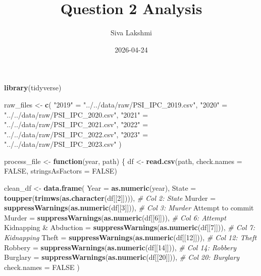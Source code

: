 \documentclass[
]{article}
\title{Question 2 Analysis}
\author{Siva Lakshmi}
\date{2026-04-24}
\newenvironment{Shaded}{\begin{snugshade}}{\end{snugshade}}
\newcommand{\AttributeTok}[1]{\textcolor[rgb]{0.13,0.29,0.53}{#1}}
\newcommand{\CommentTok}[1]{\textcolor[rgb]{0.56,0.35,0.01}{\textit{#1}}}
\newcommand{\ConstantTok}[1]{\textcolor[rgb]{0.56,0.35,0.01}{#1}}
\newcommand{\ControlFlowTok}[1]{\textcolor[rgb]{0.13,0.29,0.53}{\textbf{#1}}}
\newcommand{\DecValTok}[1]{\textcolor[rgb]{0.00,0.00,0.81}{#1}}
\newcommand{\FunctionTok}[1]{\textcolor[rgb]{0.13,0.29,0.53}{\textbf{#1}}}
\newcommand{\NormalTok}[1]{#1}
\newcommand{\OtherTok}[1]{\textcolor[rgb]{0.56,0.35,0.01}{#1}}
\newcommand{\StringTok}[1]{\textcolor[rgb]{0.31,0.60,0.02}{#1}}
\begin{document}
\maketitle

\begin{Shaded}
\begin{Highlighting}[]
\FunctionTok{library}\NormalTok{(tidyverse)}

\NormalTok{raw\_files }\OtherTok{\textless{}{-}} \FunctionTok{c}\NormalTok{(}
  \StringTok{"2019"} \OtherTok{=} \StringTok{"../../data/raw/PSI\_IPC\_2019.csv"}\NormalTok{,}
  \StringTok{"2020"} \OtherTok{=} \StringTok{"../../data/raw/PSI\_IPC\_2020.csv"}\NormalTok{,}
  \StringTok{"2021"} \OtherTok{=} \StringTok{"../../data/raw/PSI\_IPC\_2021.csv"}\NormalTok{,}
  \StringTok{"2022"} \OtherTok{=} \StringTok{"../../data/raw/PSI\_IPC\_2022.csv"}\NormalTok{,}
  \StringTok{"2023"} \OtherTok{=} \StringTok{"../../data/raw/PSI\_IPC\_2023.csv"}
\NormalTok{)}

\NormalTok{process\_file }\OtherTok{\textless{}{-}} \ControlFlowTok{function}\NormalTok{(year, path) \{}
\NormalTok{  df }\OtherTok{\textless{}{-}} \FunctionTok{read.csv}\NormalTok{(path, }\AttributeTok{check.names =} \ConstantTok{FALSE}\NormalTok{, }\AttributeTok{stringsAsFactors =} \ConstantTok{FALSE}\NormalTok{)}
  
\NormalTok{  clean\_df }\OtherTok{\textless{}{-}} \FunctionTok{data.frame}\NormalTok{(}
    \AttributeTok{Year =} \FunctionTok{as.numeric}\NormalTok{(year),}
    \AttributeTok{State =} \FunctionTok{toupper}\NormalTok{(}\FunctionTok{trimws}\NormalTok{(}\FunctionTok{as.character}\NormalTok{(df[[}\DecValTok{2}\NormalTok{]]))), }\CommentTok{\# Col 2: State}
    \AttributeTok{Murder =} \FunctionTok{suppressWarnings}\NormalTok{(}\FunctionTok{as.numeric}\NormalTok{(df[[}\DecValTok{3}\NormalTok{]])), }\CommentTok{\# Col 3: Murder}
    \StringTok{\textasciigrave{}}\AttributeTok{Attempt to commit Murder}\StringTok{\textasciigrave{}} \OtherTok{=} \FunctionTok{suppressWarnings}\NormalTok{(}\FunctionTok{as.numeric}\NormalTok{(df[[}\DecValTok{6}\NormalTok{]])), }\CommentTok{\# Col 6: Attempt}
    \StringTok{\textasciigrave{}}\AttributeTok{Kidnapping \& Abduction}\StringTok{\textasciigrave{}} \OtherTok{=} \FunctionTok{suppressWarnings}\NormalTok{(}\FunctionTok{as.numeric}\NormalTok{(df[[}\DecValTok{7}\NormalTok{]])), }\CommentTok{\# Col 7: Kidnapping}
    \AttributeTok{Theft =} \FunctionTok{suppressWarnings}\NormalTok{(}\FunctionTok{as.numeric}\NormalTok{(df[[}\DecValTok{12}\NormalTok{]])), }\CommentTok{\# Col 12: Theft}
    \AttributeTok{Robbery =} \FunctionTok{suppressWarnings}\NormalTok{(}\FunctionTok{as.numeric}\NormalTok{(df[[}\DecValTok{14}\NormalTok{]])), }\CommentTok{\# Col 14: Robbery}
    \AttributeTok{Burglary =} \FunctionTok{suppressWarnings}\NormalTok{(}\FunctionTok{as.numeric}\NormalTok{(df[[}\DecValTok{20}\NormalTok{]])), }\CommentTok{\# Col 20: Burglary}
    \AttributeTok{check.names =} \ConstantTok{FALSE}
\NormalTok{  )}
  

\end{Highlighting}
\end{Shaded}
\end{document}
